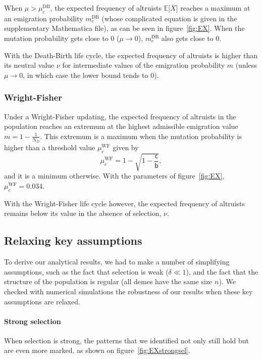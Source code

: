\documentclass[11pt, letterpaper]{article}
\newcommand{\Esp}[1]{\mathbb{E}\big[ #1\big]}%
\newcommand{\bb}{\mathsf{b}}
\newcommand{\cc}{\mathsf{c}}
\newcommand{\DB}{\textrm{DB}}
\newcommand{\WF}{\textrm{WF}}
\newcommand{\mutbias}{\nu}
\newcommand{\ndemes}{N_D}
\newcommand{\selstr}{\delta}
\begin{document}
When $\mu > \mu_c^{\DB}$, the expected frequency of altruists $\Esp{\overline{X}}$ reaches a maximum at an emigration probability $m_c^{\DB}$ (whose complicated equation is given in the supplementary Mathematica file), as can be seen in figure~\ref{fig:EX}. When the mutation probability gets close to $0$ ($\mu \to 0$), $m_c^{\DB}$ also gets close to $0$.

With the Death-Birth life cycle, the expected frequency of altruists is higher than its neutral value $\mutbias$ for intermediate values of the emigration probability $m$ (unless $\mu \to 0$, in which case the lower bound tends to $0$).

\subsubsection*{Wright-Fisher}

Under a Wright-Fisher updating, the expected frequency of altruists in the population reaches an extremum at the highest admissible emigration value $m = 1-\frac{1}{\ndemes}$. This extremum is a maximum when the mutation probability is higher than a threshold value $\mu_c^{\WF}$ given by 
\begin{equation}
\mu_c^{\WF} = 1-\sqrt{1-\frac{\cc}{\bb}},
\end{equation}
and it is a minimum otherwise. With the parameters of figure~\ref{fig:EX}, $\mu_c^{\WF} = 0.034$. 

With the Wright-Fisher life cycle however, the expected frequency of altruists remains below its value in the absence of selection, $\mutbias$. 




\subsection*{Relaxing key assumptions}

To derive our analytical results, we had to make a number of simplifying assumptions, such as the fact that selection is weak ($\selstr \ll 1$), and the fact that the structure of the population is regular (all demes have the same size $n$). We checked with numerical simulations the robustness of our results when these key assumptions are relaxed. 

\paragraph{Strong selection}When selection is strong, the patterns that we identified not only still hold but are even more marked, as shown on figure~\ref{fig:EXstrongsel}. 
\end{document}
